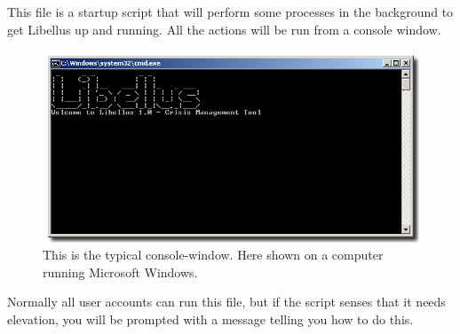 \documentclass[letterpaper,10pt,english]{sphinxmanual}
\begin{document}
This file is a startup script that will perform some processes in the background to get Libellus up and running. All the actions will be run from a console window.
\begin{figure}[htbp]
\centering
\capstart

\includegraphics{console.png}
\caption{This is the typical console-window. Here shown on a computer running Microsoft Windows.}\end{figure}

Normally all user accounts can run this file, but if the script senses that it needs elevation, you will be prompted with a message telling you how to do this.
\end{document}
